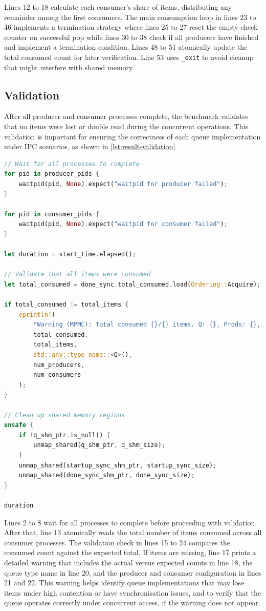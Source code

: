 Lines 12 to 18 calculate each consumer's share of items, distributing any remainder among the first consumers. The main consumption loop in lines 23 to 46 implements a termination strategy where lines 25 to 27 reset the empty check counter on successful pop while lines 30 to 38 check if all producers have finished and implement a termination condition. Lines 48 to 51 atomically update the total consumed count for later verification. Line 53 uses \texttt{\_exit} to avoid cleanup that might interfere with shared memory.

\subsection{Validation}
After all producer and consumer processes complete, the benchmark validates that no items were lost or double read during the concurrent operations. This validation is important for ensuring the correctness of each queue implementation under \ac{IPC} scenarios, as shown in \cref{lst:result-validation}.

\begin{lstlisting}[language=Rust, style=boxed, caption={Post-benchmark validation of results}, label={lst:result-validation}]
// Wait for all processes to complete
for pid in producer_pids {
    waitpid(pid, None).expect("waitpid for producer failed");
}

for pid in consumer_pids {
    waitpid(pid, None).expect("waitpid for consumer failed");
}

let duration = start_time.elapsed();

// Validate that all items were consumed
let total_consumed = done_sync.total_consumed.load(Ordering::Acquire);

if total_consumed != total_items {
    eprintln!(
        "Warning (MPMC): Total consumed {}/{} items. Q: {}, Prods: {}, Cons: {}",
        total_consumed,
        total_items,
        std::any::type_name::<Q>(),
        num_producers,
        num_consumers
    );
}

// Clean up shared memory regions
unsafe {
    if !q_shm_ptr.is_null() {
        unmap_shared(q_shm_ptr, q_shm_size);
    }
    unmap_shared(startup_sync_shm_ptr, startup_sync_size);
    unmap_shared(done_sync_shm_ptr, done_sync_size);
}

duration
\end{lstlisting}

Lines 2 to 8 wait for all processes to complete before proceeding with validation. After that, line 13 atomically reads the total number of items consumed across all consumer processes. The validation check in lines 15 to 24 compares the consumed count against the expected total. If items are missing, line 17 prints a detailed warning that includes the actual versus expected counts in line 18, the queue type name in line 20, and the producer and consumer configuration in lines 21 and 22. This warning helps identify queue implementations that may lose items under high contention or have synchronisation issues, and to verify that the queue operates correctly under concurrent access, if the warning does not appear.

